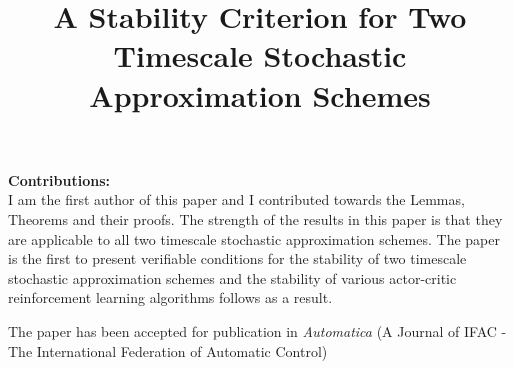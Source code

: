 \documentclass[8pt]{article}
\title{A Stability Criterion for Two Timescale Stochastic Approximation Schemes}
\author{}
\date{}
\begin{document}
\maketitle

\textbf{Contributions:\\}
I am the first author of this paper and I contributed towards the Lemmas, Theorems and their proofs. The strength of the results in this paper is that they are applicable to all two timescale stochastic approximation schemes. The paper is the first to present verifiable conditions for the stability of two timescale stochastic approximation schemes and the stability of various actor-critic reinforcement learning algorithms follows as a result.
\par
The paper has been accepted for publication in \emph{Automatica} (A Journal of IFAC - The International
Federation of Automatic Control)

\end{document}
